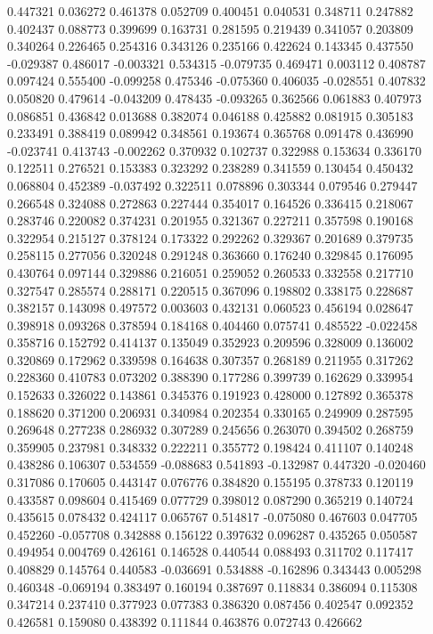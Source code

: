 0.447321
0.036272
0.461378
0.052709
0.400451
0.040531
0.348711
0.247882
0.402437
0.088773
0.399699
0.163731
0.281595
0.219439
0.341057
0.203809
0.340264
0.226465
0.254316
0.343126
0.235166
0.422624
0.143345
0.437550
-0.029387
0.486017
-0.003321
0.534315
-0.079735
0.469471
0.003112
0.408787
0.097424
0.555400
-0.099258
0.475346
-0.075360
0.406035
-0.028551
0.407832
0.050820
0.479614
-0.043209
0.478435
-0.093265
0.362566
0.061883
0.407973
0.086851
0.436842
0.013688
0.382074
0.046188
0.425882
0.081915
0.305183
0.233491
0.388419
0.089942
0.348561
0.193674
0.365768
0.091478
0.436990
-0.023741
0.413743
-0.002262
0.370932
0.102737
0.322988
0.153634
0.336170
0.122511
0.276521
0.153383
0.323292
0.238289
0.341559
0.130454
0.450432
0.068804
0.452389
-0.037492
0.322511
0.078896
0.303344
0.079546
0.279447
0.266548
0.324088
0.272863
0.227444
0.354017
0.164526
0.336415
0.218067
0.283746
0.220082
0.374231
0.201955
0.321367
0.227211
0.357598
0.190168
0.322954
0.215127
0.378124
0.173322
0.292262
0.329367
0.201689
0.379735
0.258115
0.277056
0.320248
0.291248
0.363660
0.176240
0.329845
0.176095
0.430764
0.097144
0.329886
0.216051
0.259052
0.260533
0.332558
0.217710
0.327547
0.285574
0.288171
0.220515
0.367096
0.198802
0.338175
0.228687
0.382157
0.143098
0.497572
0.003603
0.432131
0.060523
0.456194
0.028647
0.398918
0.093268
0.378594
0.184168
0.404460
0.075741
0.485522
-0.022458
0.358716
0.152792
0.414137
0.135049
0.352923
0.209596
0.328009
0.136002
0.320869
0.172962
0.339598
0.164638
0.307357
0.268189
0.211955
0.317262
0.228360
0.410783
0.073202
0.388390
0.177286
0.399739
0.162629
0.339954
0.152633
0.326022
0.143861
0.345376
0.191923
0.428000
0.127892
0.365378
0.188620
0.371200
0.206931
0.340984
0.202354
0.330165
0.249909
0.287595
0.269648
0.277238
0.286932
0.307289
0.245656
0.263070
0.394502
0.268759
0.359905
0.237981
0.348332
0.222211
0.355772
0.198424
0.411107
0.140248
0.438286
0.106307
0.534559
-0.088683
0.541893
-0.132987
0.447320
-0.020460
0.317086
0.170605
0.443147
0.076776
0.384820
0.155195
0.378733
0.120119
0.433587
0.098604
0.415469
0.077729
0.398012
0.087290
0.365219
0.140724
0.435615
0.078432
0.424117
0.065767
0.514817
-0.075080
0.467603
0.047705
0.452260
-0.057708
0.342888
0.156122
0.397632
0.096287
0.435265
0.050587
0.494954
0.004769
0.426161
0.146528
0.440544
0.088493
0.311702
0.117417
0.408829
0.145764
0.440583
-0.036691
0.534888
-0.162896
0.343443
0.005298
0.460348
-0.069194
0.383497
0.160194
0.387697
0.118834
0.386094
0.115308
0.347214
0.237410
0.377923
0.077383
0.386320
0.087456
0.402547
0.092352
0.426581
0.159080
0.438392
0.111844
0.463876
0.072743
0.426662
